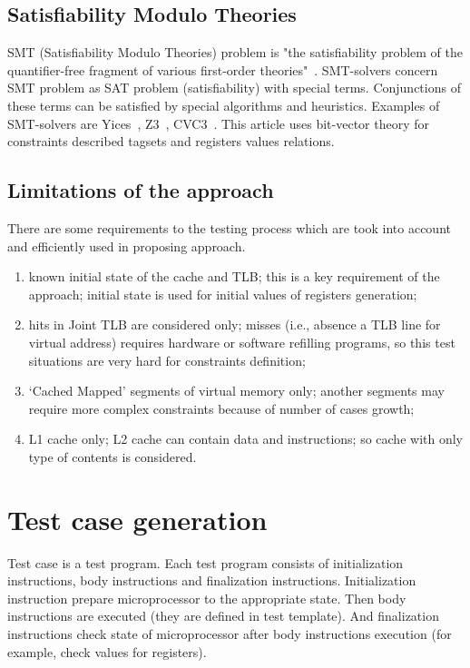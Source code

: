 \documentclass[times, 10pt,twocolumn]{article}
\begin{document}
\subsection{Satisfiability Modulo Theories}
SMT (Satisfiability Modulo Theories) problem is "the satisfiability
problem of the quantifier-free fragment of various first-order
theories"~\cite{SMT}. SMT-solvers concern SMT problem as SAT problem
(satisfiability) with special terms. Conjunctions of these terms can
be satisfied by special algorithms and heuristics. Examples of
SMT-solvers are Yices~\cite{Yices}, Z3~\cite{Z3}, CVC3~\cite{CVC3}.
This article uses bit-vector theory for constraints described
tagsets and registers values relations.

\subsection{Limitations of the approach}
There are some requirements to the testing process which are took into account and efficiently used in proposing approach.
\begin{enumerate}
\item known initial state of the cache and TLB; this is a key requirement of the approach; initial state is used for initial values of registers generation;
\item hits in Joint TLB are considered only; misses (i.e., absence a TLB line for virtual address) requires hardware or software refilling programs, so this test situations are very hard for constraints definition;
\item `Cached Mapped' segments of virtual memory only; another segments may require more complex constraints because of number of cases growth;
\item L1 cache only; L2 cache can contain data and instructions; so cache with only type of contents is considered.
\end{enumerate}

\section{Test case generation}

Test case is a test program. Each test program consists of initialization instructions, body instructions and finalization instructions. Initialization instruction prepare microprocessor to the appropriate state. Then body instructions are executed (they are defined in test template). And finalization instructions check state of microprocessor after body instructions execution (for example, check values for registers).
\end{document}
